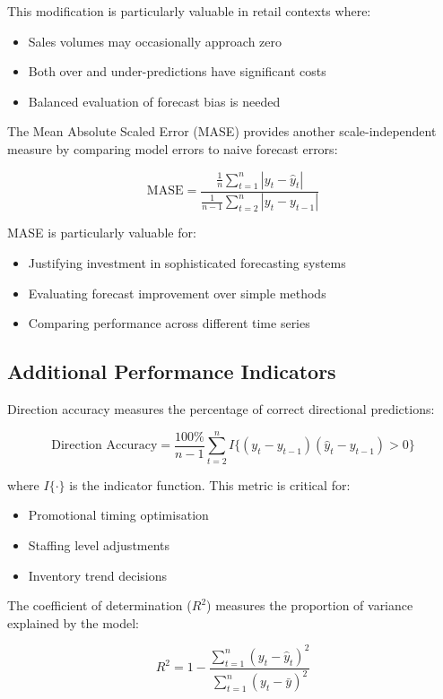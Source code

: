 \documentclass[12pt,a4paper]{report}
\begin{document}
This modification is particularly valuable in retail contexts where:
\begin{itemize}
    \item Sales volumes may occasionally approach zero
    \item Both over and under-predictions have significant costs
    \item Balanced evaluation of forecast bias is needed
\end{itemize}

The Mean Absolute Scaled Error (MASE) provides another scale-independent measure by comparing model errors to naive forecast errors:

\[
\text{MASE} = \frac{\frac{1}{n}\sum_{t=1}^{n}|y_t - \hat{y}_t|}{\frac{1}{n-1}\sum_{t=2}^{n}|y_t - y_{t-1}|}
\]

MASE is particularly valuable for:
\begin{itemize}
    \item Justifying investment in sophisticated forecasting systems
    \item Evaluating forecast improvement over simple methods
    \item Comparing performance across different time series
\end{itemize}

\subsection{Additional Performance Indicators}

Direction accuracy measures the percentage of correct directional predictions:

\[
\text{Direction Accuracy} = \frac{100\%}{n-1} \sum_{t=2}^{n} I\{(y_t - y_{t-1})(\hat{y}_t - y_{t-1}) > 0\}
\]

where \(I\{\cdot\}\) is the indicator function. This metric is critical for:
\begin{itemize}
    \item Promotional timing optimisation
    \item Staffing level adjustments
    \item Inventory trend decisions
\end{itemize}

The coefficient of determination (\(R^2\)) measures the proportion of variance explained by the model:

\[
R^2 = 1 - \frac{\sum_{t=1}^{n}(y_t - \hat{y}_t)^2}{\sum_{t=1}^{n}(y_t - \bar{y})^2}
\]
\end{document}
